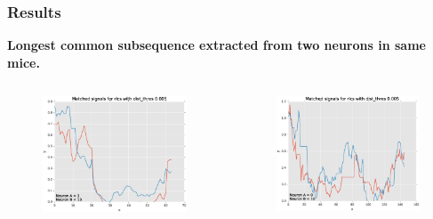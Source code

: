 \documentclass{beamer}
\begin{document}
\begin{frame}
    \frametitle{Results}
    \textbf{Longest common subsequence extracted from two neurons in same mice.}
    \begin{columns}[c]
    \begin{figure}
    \includegraphics[width=\linewidth]{img/rlcsMain_getSegs_2016_04_06_10_23_00}
    \end{figure}

    \begin{figure}
    \includegraphics[width=\linewidth]{img/rlcsMain_getSegs_2016_04_06_10_22_55}
    \end{figure}
    \end{columns}
\end{frame}
\end{document}

